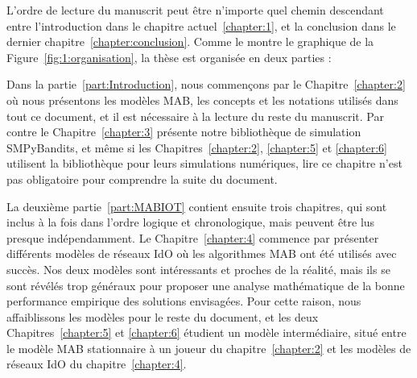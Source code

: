 \begin{resume_fr}
L'ordre de lecture du manuscrit peut être n'importe quel chemin descendant entre l'introduction dans le chapitre actuel~\ref{chapter:1}, et la conclusion dans le dernier chapitre~\ref{chapter:conclusion}.
Comme le montre le graphique de la Figure~\ref{fig:1:organisation},
la thèse est organisée en deux parties :

Dans la partie~\ref{part:Introduction}, nous commençons par le Chapitre~\ref{chapter:2} où nous présentons les modèles MAB, les concepts et les notations utilisés dans tout ce document, et il est nécessaire à la lecture du reste du manuscrit.
Par contre le Chapitre~\ref{chapter:3} présente notre bibliothèque de simulation SMPyBandits, et même si les Chapitres~\ref{chapter:2}, \ref{chapter:5} et \ref{chapter:6} utilisent la bibliothèque pour leurs simulations numériques, lire ce chapitre n'est pas obligatoire pour comprendre la suite du document.

La deuxième partie~\ref{part:MABIOT} contient ensuite trois chapitres, qui sont inclus à la fois dans l'ordre logique et chronologique, mais peuvent être lus presque indépendamment.
Le Chapitre~\ref{chapter:4} commence par présenter différents modèles de réseaux IdO où les algorithmes MAB ont été utilisés avec succès. Nos deux modèles sont intéressants et proches de la réalité, mais ils se sont révélés trop généraux pour proposer une analyse mathématique de la bonne performance empirique des solutions envisagées.
Pour cette raison, nous affaiblissons les modèles pour le reste du document,
et les deux Chapitres~\ref{chapter:5} et \ref{chapter:6} étudient un modèle intermédiaire, situé entre le modèle MAB stationnaire à un joueur du chapitre~\ref{chapter:2} et les modèles de réseaux IdO du chapitre~\ref{chapter:4}.

\end{resume_fr}
